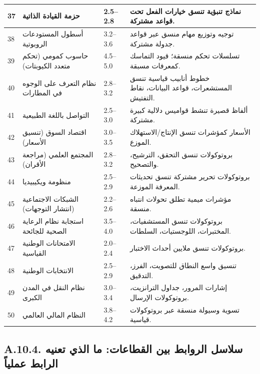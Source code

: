 \documentclass[13pt,a4paper]{article}
\begin{document}
\begin{longtable}{|p{0.8cm}|p{6.2cm}|p{3.0cm}|p{5.7cm}|}
		\hline
		37 & حزمة القيادة الذاتية & 2.5--2.8 & نماذج تنبؤية تنسق خيارات الفعل تحت قواعد مشتركة. \\
		\hline
		38 & أسطول المستودعات الروبوتية & 3.2--3.6 & توجيه وتوزيع مهام منسق عبر قواعد جدولة مشتركة. \\
		\hline
		39 & حاسوب كمومي (تحكم متعدد الكيوبتات) & 4.5--5.0 & تسلسلات تحكم منسقة؛ قيود التماسك كمعرفات مسبقة. \\
		\hline
		40 & نظام التعرف على الوجوه في المطارات & 2.8--3.2 & خطوط أنابيب قياسية تنسق المستشعرات، قواعد البيانات، نقاط التفتيش. \\
		\hline
		41 & التواصل باللغة الطبيعية & 2.5--3.0 & ألفاظ قصيرة تنشط قواميس دلالية كبيرة مشتركة. \\
		\hline
		42 & اقتصاد السوق (تنسيق الأسعار) & 3.0--3.5 & الأسعار كمؤشرات تنسق الإنتاج/الاستهلاك الموزع. \\
		\hline
		43 & المجتمع العلمي (مراجعة الأقران) & 2.8--3.2 & بروتوكولات تنسق التحقق، الترشيح، والتصحيح. \\
		\hline
		44 & منظومة ويكيبيديا & 2.5--2.9 & بروتوكولات تحرير مشتركة تنسق تحديثات المعرفة الموزعة. \\
		\hline
		45 & الشبكات الاجتماعية (انتشار التوجهات) & 2.2--2.6 & مؤشرات ميمية تطلق تحولات انتباه منسقة. \\
		\hline
		46 & استجابة نظام الرعاية الصحية للجائحة & 3.5--4.0 & بروتوكولات تنسق المستشفيات، المختبرات، اللوجستيات، السلطات. \\
		\hline
		47 & الامتحانات الوطنية القياسية & 2.0--2.4 & بروتوكولات تنسق ملايين أحداث الاختبار. \\
		\hline
		48 & الانتخابات الوطنية & 2.5--2.9 & تنسيق واسع النطاق للتصويت، الفرز، التدقيق. \\
		\hline
		49 & نظام النقل في المدن الكبرى & 3.0--3.4 & إشارات المرور، جداول الترانزيت، بروتوكولات الإرسال. \\
		\hline
		50 & النظام المالي العالمي & 3.8--4.2 & تسوية وسيولة منسقة عبر بروتوكولات قياسية. \\
		\hline
	\end{longtable}
	
	\subsection*{A.10.4. سلاسل الروابط بين القطاعات: ما الذي تعنيه الرابط عملياً}
	
\end{document}
